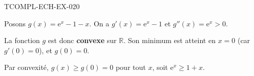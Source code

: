 \begin{corrige}{TCOMPL-ECH-EX-020}


Posons $g(x) = \mathrm{e}^x - 1 - x$. On a $g'(x) = \mathrm{e}^x - 1$ et $g''(x) = \mathrm{e}^x > 0$.

La fonction $g$ est donc \textbf{convexe} sur $\mathbb{R}$. Son minimum est atteint en $x=0$ (car $g'(0)=0$), et $g(0) = 0$.

Par convexité, $g(x) \geq g(0) = 0$ pour tout $x$, soit $\mathrm{e}^x \geq 1 + x$.

\end{corrige}
